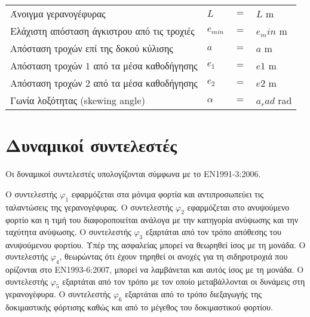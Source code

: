 \begin{tabular}{llcl}
    Άνοιγμα γερανογέφυρας                         &$L$          &$=$ &${{ L }}$ m \\
    Ελάχιστη απόσταση άγκιστρου από τις τροχιές   &$e_{min}$    &$=$ &${{ e_min }}$ m \\
    Απόσταση τροχών επί της δοκού κύλισης         &$a$          &$=$ &${{ a }}$ m \\
    Απόσταση τροχών $1$ από τα μέσα καθοδήγησης   &$e_1$        &$=$ &${{ e1 }}$ m \\
    Απόσταση τροχών $2$ από τα μέσα καθοδήγησης   &$e_2$        &$=$ &${{ e2 }}$ m \\
    Γωνία λοξότητας (skewing angle)               &$α$          &$=$ &${{ a_rad }}$ rad
\end{tabular}

\section{Δυναμικοί συντελεστές}
Οι δυναμικοί συντελεστές υπολογίζονται σύμφωνα με το ΕΝ1991-3:2006.

Ο συντελεστής $φ_1$ εφαρμόζεται στα μόνιμα φορτία και αντιπροσωπεύει τις ταλαντώσεις της
γερανογέφυρας. Ο συντελεστής $φ_2$ εφαρμόζεται στο ανυψούμενο φορτίο και η τιμή του διαφοροποιείται
ανάλογα με την κατηγορία ανύψωσης και την ταχύτητα ανύψωσης. Ο συντελεστής $φ_3$ εξαρτάται από τον
τρόπο απόθεσης του ανυψούμενου φορτίου. Υπέρ της ασφαλείας μπορεί να θεωρηθεί ίσος με τη μονάδα.
Ο συντελεστής $φ_4$, θεωρώντας ότι έχουν τηρηθεί οι ανοχές για τη σιδηροτροχιά που ορίζονται στο
ΕΝ1993-6:2007, μπορεί να λαμβάνεται και αυτός ίσος με τη μονάδα. Ο συντελεστής $φ_5$ εξαρτάται από
τον τρόπο με τον οποίο μεταβάλλονται οι δυνάμεις στη γερανογέφυρα. Ο συντελεστής $φ_6$ εξαρτάται από
το τρόπο διεξαγωγής της δοκιμαστικής φόρτισης καθώς και από το μέγεθος του δοκιμαστικού φορτίου.

